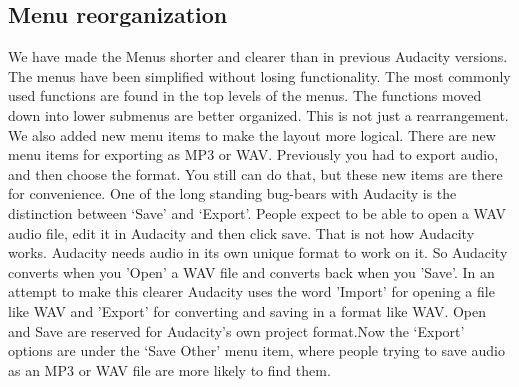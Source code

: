 \begin{multicols}{2}
\subsection{Menu reorganization}We have made the Menus shorter and clearer than in previous Audacity versions. The menus have been simplified without losing functionality. The most commonly used functions are found in the top levels of the menus. The functions moved down into lower submenus are better organized.
This is not just a rearrangement.  We also added new menu items to make the layout more logical.  There are new menu items for exporting as MP3 or WAV. Previously you had to export audio, and then choose the format. You still can do that, but these new items are there for convenience.
One of the long standing bug-bears with Audacity is the distinction between ‘Save’ and ‘Export’. People expect to be able to open a WAV audio file, edit it in Audacity and then click save. That is not how Audacity works. Audacity needs audio in its own unique format to work on it. So Audacity converts when you 'Open' a WAV file and converts back when you 'Save'. In an attempt to make this clearer Audacity uses the word 'Import' for opening a file like WAV and 'Export' for converting and saving in a format like WAV. Open and Save are reserved for Audacity's own project format.Now the ‘Export’ options are under the ‘Save Other’ menu item, where people trying to save audio as an MP3 or WAV file are more likely to find them.
\label{new_features_in_this_release_extendedmenubar}

\end{multicols}
